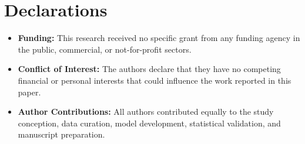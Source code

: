 \documentclass[pdflatex,sn-mathphys,Numbered]{sn-jnl}
\begin{document}
\section*{Declarations}
\begin{itemize}
    \item \textbf{Funding:} This research received no specific grant from any funding agency in the public, commercial, or not-for-profit sectors.
    \item \textbf{Conflict of Interest:} The authors declare that they have no competing financial or personal interests that could influence the work reported in this paper.
    \item \textbf{Author Contributions:} All authors contributed equally to the study conception, data curation, model development, statistical validation, and manuscript preparation.
\end{itemize}
\end{document}
